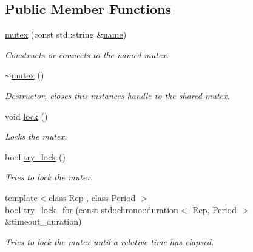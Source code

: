 \subsection*{Public Member Functions}
\begin{DoxyCompactItemize}
\item 
\hyperlink{classcpen333_1_1process_1_1windows_1_1mutex_a6bd2d0c07f83dd5646cbdbadbfc8fc58}{mutex} (const std\+::string \&\hyperlink{classcpen333_1_1process_1_1impl_1_1named__resource__base_a53986a0a1dd26a3602b842c45613b79d}{name})
\begin{DoxyCompactList}\small\item\em Constructs or connects to the named mutex. \end{DoxyCompactList}\item 
\mbox{\label{classcpen333_1_1process_1_1windows_1_1mutex_a51a169fed979fd4dcb0a4f9c17cdb99e}} 
\hyperlink{classcpen333_1_1process_1_1windows_1_1mutex_a51a169fed979fd4dcb0a4f9c17cdb99e}{$\sim$mutex} ()
\begin{DoxyCompactList}\small\item\em Destructor, closes this instance\textquotesingle{}s handle to the shared mutex. \end{DoxyCompactList}\item 
void \hyperlink{classcpen333_1_1process_1_1windows_1_1mutex_a887f0647207b0e0fa1bead1500c95aec}{lock} ()
\begin{DoxyCompactList}\small\item\em Locks the mutex. \end{DoxyCompactList}\item 
bool \hyperlink{classcpen333_1_1process_1_1windows_1_1mutex_a8fe777a1d576868de91b34d3727132e2}{try\+\_\+lock} ()
\begin{DoxyCompactList}\small\item\em Tries to lock the mutex. \end{DoxyCompactList}\item 
{\footnotesize template$<$class Rep , class Period $>$ }\\bool \hyperlink{classcpen333_1_1process_1_1windows_1_1mutex_aa6a64c60b601c226648cce293835c802}{try\+\_\+lock\+\_\+for} (const std\+::chrono\+::duration$<$ Rep, Period $>$ \&timeout\+\_\+duration)
\begin{DoxyCompactList}\small\item\em Tries to lock the mutex until a relative time has elapsed. \end{DoxyCompactList}\item 

\end{DoxyCompactItemize}
